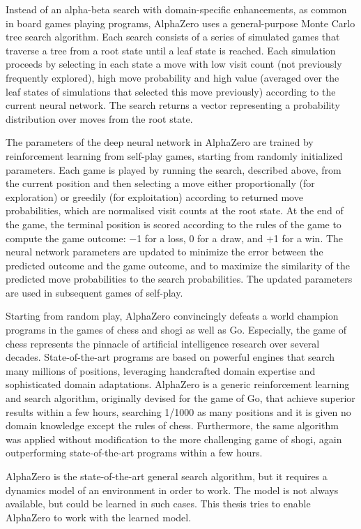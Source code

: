 Instead of an alpha-beta search with domain-specific enhancements, as common in board games playing programs, AlphaZero uses a general-purpose Monte Carlo tree search \cite{Algo.MCTS} algorithm. Each search consists of a series of simulated games that traverse a tree from a root state until a leaf state is reached. Each simulation proceeds by selecting in each state a move with low visit count (not previously frequently explored), high move probability and high value (averaged over the leaf states of simulations that selected this move previously) according to the current neural network. The search returns a vector representing a probability distribution over moves from the root state.

The parameters of the deep neural network in AlphaZero are trained by reinforcement learning from self-play games, starting from randomly initialized parameters. Each game is played by running the search, described above, from the current position and then selecting a move either proportionally (for exploration) or greedily (for exploitation) according to returned move probabilities, which are normalised visit counts at the root state. At the end of the game, the terminal position is scored according to the rules of the game to compute the game outcome: −1 for a loss, 0 for a draw, and +1 for a win. The neural network parameters are updated to minimize the error between the predicted outcome and the game outcome, and to maximize the similarity of the predicted move probabilities to the search probabilities. The updated parameters are used in subsequent games of self-play.

Starting from random play, AlphaZero convincingly defeats a world champion programs in the games of chess and shogi as well as Go. Especially, the game of chess represents the pinnacle of artificial intelligence research over several decades. State-of-the-art programs are based on powerful engines that search many millions of positions, leveraging handcrafted domain expertise and sophisticated domain adaptations. AlphaZero is a generic reinforcement learning and search algorithm, originally devised for the game of Go, that achieve superior results within a few hours, searching 1/1000 as many positions and it is given no domain knowledge except the rules of chess. Furthermore, the same algorithm was applied without modification to the more challenging game of shogi, again outperforming state-of-the-art programs within a few hours.

AlphaZero is the state-of-the-art general search algorithm, but it requires a dynamics model of an environment in order to work. The model is not always available, but could be learned in such cases. This thesis tries to enable AlphaZero to work with the learned model.

